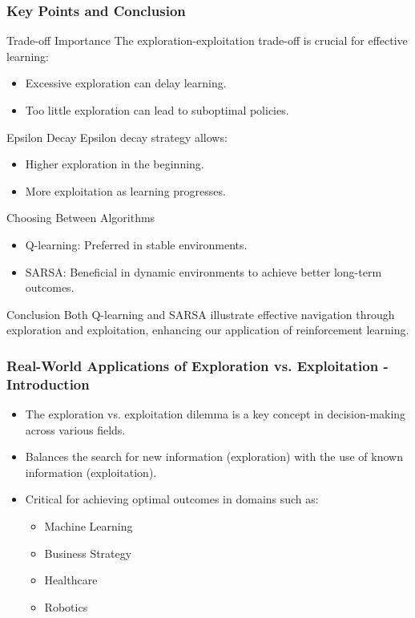 \documentclass[aspectratio=169]{beamer}
\begin{document}
\begin{frame}[fragile]
    \frametitle{Key Points and Conclusion}
    \begin{block}{Trade-off Importance}
        The exploration-exploitation trade-off is crucial for effective learning:
        \begin{itemize}
            \item Excessive exploration can delay learning.
            \item Too little exploration can lead to suboptimal policies.
        \end{itemize}
    \end{block}

    \begin{block}{Epsilon Decay}
        Epsilon decay strategy allows:
        \begin{itemize}
            \item Higher exploration in the beginning.
            \item More exploitation as learning progresses.
        \end{itemize}
    \end{block}
    
    \begin{block}{Choosing Between Algorithms}
        \begin{itemize}
            \item Q-learning: Preferred in stable environments.
            \item SARSA: Beneficial in dynamic environments to achieve better long-term outcomes.
        \end{itemize}
    \end{block}
    
    \begin{block}{Conclusion}
        Both Q-learning and SARSA illustrate effective navigation through exploration and exploitation, enhancing our application of reinforcement learning.
    \end{block}
\end{frame}

\begin{frame}[fragile]
    \frametitle{Real-World Applications of Exploration vs. Exploitation - Introduction}
    \begin{itemize}
        \item The exploration vs. exploitation dilemma is a key concept in decision-making across various fields.
        \item Balances the search for new information (exploration) with the use of known information (exploitation).
        \item Critical for achieving optimal outcomes in domains such as:
        \begin{itemize}
            \item Machine Learning
            \item Business Strategy
            \item Healthcare
            \item Robotics
        \end{itemize}
    \end{itemize}
\end{frame}
\end{document}
